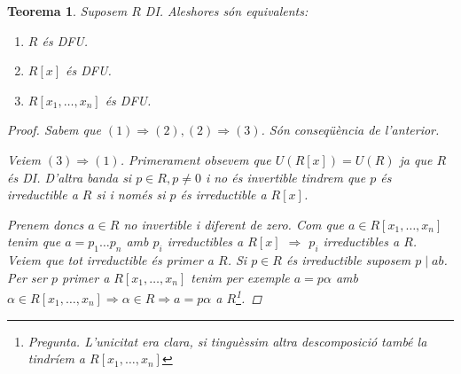 \documentclass[a4paper,11pt]{report}
\newcommand{\im}{\Rightarrow}
\theoremstyle{theorem}
\newtheorem{teorema}{\normalfont \sffamily\bfseries Teorema}[section]
\theoremstyle{definition}
\begin{document}
\begin{teorema}
	Suposem $R$ DI. Aleshores són equivalents:
	\begin{enumerate}
		\item $R$ és DFU.
		\item $R[x]$ és DFU.
		\item $R[x_1,\ldots,x_n]$ és DFU.
	\end{enumerate}
\begin{proof}
	Sabem que $(1)\im (2),(2)\im(3)$. Són conseqüència de l'anterior.
	
	Veiem $(3)\im(1)$. Primerament obsevem que $U(R[x])=U(R)$ ja que $R$ és DI. D'altra banda si $p\in R,p\neq0$ i no és invertible tindrem que $p$ és irreductible a $R$ si i només si $p$ és irreductible a $R[x]$.
	
	Prenem doncs $a\in R$ no invertible i diferent de zero. Com que $a\in R[x_1,\ldots,x_n]$ tenim que $a=p_1\ldots p_n$ amb $p_i$ irreductibles a $R[x]$ $\im$ $p_i$ irreductibles a $R$. Veiem que tot irreductible és primer a $R$. Si $p\in R$ és irreductible suposem $p\mid ab$. Per ser $p$ primer a $R[x_1,\ldots,x_n]$ tenim per exemple $a=p\alpha$ amb $\alpha\in R[x_1,\ldots,x_n]\im \alpha \in R\im a=p\alpha$ a $R$\footnote{Pregunta. L'unicitat era clara, si tinguèssim altra descomposició també la tindríem a $R[x_1,\ldots,x_n]$}.
\end{proof}
\end{teorema}
\end{document}
